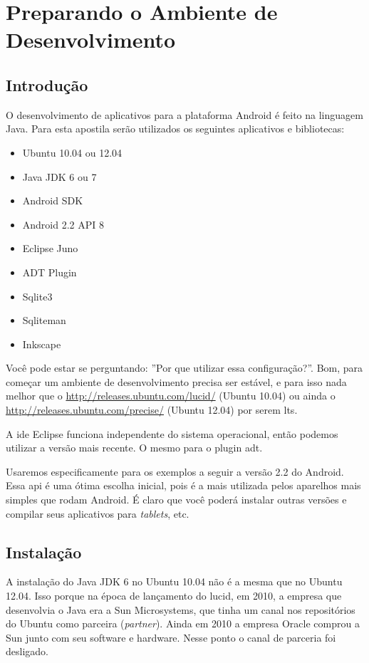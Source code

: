 \chapter{Preparando o Ambiente de Desenvolvimento}

\section{Introdução}

O desenvolvimento de aplicativos para a plataforma Android é feito na linguagem Java.
Para esta apostila serão utilizados os seguintes aplicativos e bibliotecas:

\begin{itemize}
	\item Ubuntu 10.04 ou 12.04
	\item Java JDK 6 ou 7
	\item Android SDK
	\item Android 2.2 API 8
	\item Eclipse Juno
	\item ADT Plugin
	\item Sqlite3
	\item Sqliteman
	\item Inkscape
\end{itemize}

Você pode estar se perguntando: ''Por que utilizar essa configuração?''. Bom, para começar
um ambiente de desenvolvimento precisa ser estável, e para isso nada melhor que o
\url{http://releases.ubuntu.com/lucid/} (Ubuntu 10.04) ou ainda o \url{http://releases.ubuntu.com/precise/}
(Ubuntu 12.04) por serem \gls{lts}.

A \gls{ide} Eclipse funciona independente do sistema operacional, então podemos utilizar a versão
mais recente. O mesmo para o plugin \gls{adt}.

Usaremos especificamente para os exemplos a seguir a versão 2.2 do Android. Essa \gls{api} é uma
ótima escolha inicial, pois é a mais utilizada pelos aparelhos mais simples que rodam Android.
É claro que você poderá instalar outras versões e compilar seus aplicativos para \textit{tablets}, etc.

\section{Instalação}

A instalação do Java JDK 6 no Ubuntu 10.04 não é a mesma que no Ubuntu 12.04. Isso porque na época
de lançamento do \gls{lucid}, em 2010, a empresa que desenvolvia o Java era a Sun Microsystems, que
tinha um canal nos repositórios do Ubuntu como parceira (\textit{partner}). Ainda em 2010 a empresa
Oracle comprou a Sun junto com seu software e hardware. Nesse ponto o canal de parceria foi desligado.

